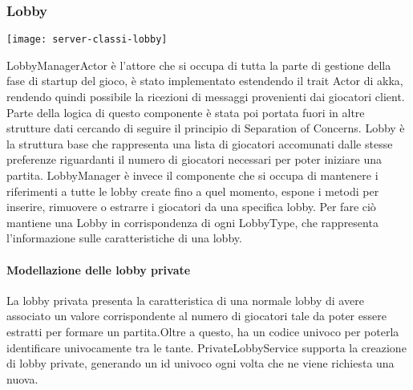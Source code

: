 \subsubsection{Lobby}
\begin{center}
    \texttt{[image: server-classi-lobby]}
\end{center}
LobbyManagerActor è l’attore che si occupa di tutta la parte di gestione della fase di startup del gioco, è stato implementato estendendo il trait Actor di akka, rendendo quindi possibile la ricezioni di messaggi provenienti dai giocatori client.
Parte della logica di questo componente è stata poi portata fuori in altre strutture dati cercando di seguire il principio di Separation of Concerns.
Lobby è la struttura base che rappresenta una lista di giocatori accomunati dalle stesse preferenze riguardanti il numero di giocatori necessari per poter iniziare una partita.
LobbyManager è invece il componente che si occupa di mantenere i riferimenti a tutte le lobby create fino a quel momento, espone i metodi per inserire, rimuovere o estrarre i giocatori da una specifica lobby.
Per fare ciò mantiene una Lobby in corrispondenza di ogni LobbyType, che rappresenta l’informazione sulle caratteristiche di una lobby.

\paragraph{Modellazione delle lobby private}
La lobby privata presenta la caratteristica di una normale lobby di avere associato un valore corrispondente al numero di giocatori tale da poter essere estratti per formare un partita.Oltre a questo, ha un codice univoco per poterla identificare univocamente tra le tante.
PrivateLobbyService supporta la creazione di lobby private, generando un id univoco ogni volta che ne viene richiesta una nuova.

